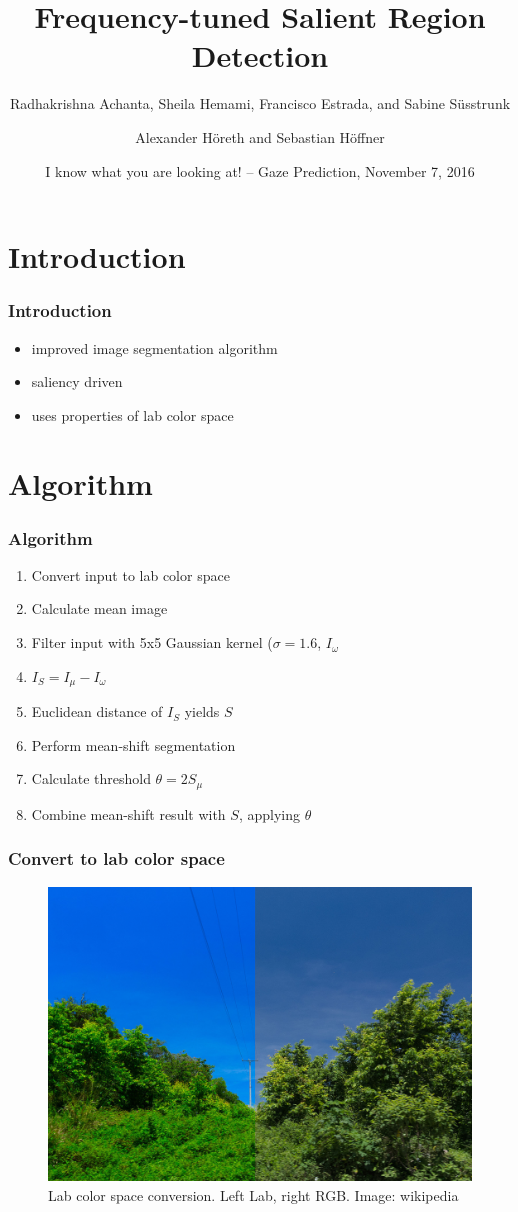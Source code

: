 \documentclass{beamer}
\title{Frequency-tuned Salient Region Detection}
\subtitle{Radhakrishna Achanta, Sheila Hemami, Francisco Estrada, and Sabine Süsstrunk}
\author{Alexander Höreth and Sebastian Höffner}
\institute{Institute of Cognitive Science\\University of Osnabrück}
\date[Nov 7, 2016]{I know what you are looking at! -- Gaze Prediction, November 7, 2016}
\begin{document}
\frame{\titlepage}


\section{Introduction}

\begin{frame}
    \frametitle{Introduction}
    \begin{itemize}
        \item improved image segmentation algorithm
        \item saliency driven
        \item uses properties of lab color space
    \end{itemize}
\end{frame}


\section{Algorithm}

\begin{frame}
    \frametitle{Algorithm}
    \begin{enumerate}
        \item Convert input to lab color space
        \item Calculate mean image
        \item Filter input with 5x5 Gaussian kernel ($\sigma = 1.6$, $I_{\omega}$
        \item $I_S = I_{\mu} - I_{\omega}$
        \item Euclidean distance of $I_S$ yields $S$
        \item Perform mean-shift segmentation
        \item Calculate threshold $\theta = 2S_{\mu}$
        \item Combine mean-shift result with $S$, applying $\theta$
    \end{enumerate}
\end{frame}

\begin{frame}
    \frametitle{Convert to lab color space}
    \begin{figure}
        \includegraphics[width=.9\textwidth]{report-images/Example_of_LAB_color_enhancement.jpg}
        \caption{Lab color space conversion. Left Lab, right RGB\@. Image: wikipedia}
    \end{figure}
\end{frame}
\end{document}
